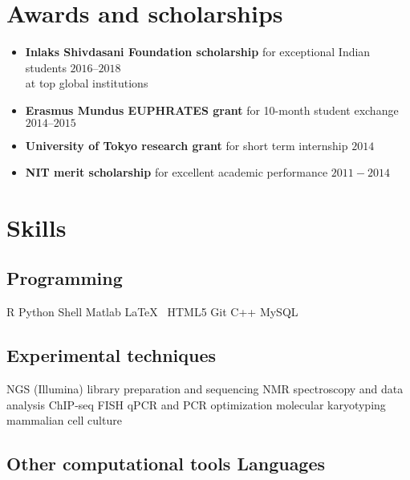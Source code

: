 \documentclass[]{TT-resume}
\begin{document}
\begin{flushleft}
\section{Awards and scholarships}
\sectionsep
\begin{itemize}
\item \textbf{Inlaks Shivdasani Foundation scholarship} for exceptional Indian students \hfill \hfill $2016 – 2018$ \\ at top global institutions

\item \textbf{Erasmus Mundus EUPHRATES grant} for 10-month student exchange \hfill \hfill $2014 – 2015$

\item \textbf{University of Tokyo research grant} for short term internship \hfill \hfill $2014$
\item \textbf{NIT merit scholarship} for excellent academic performance \hfill \hfill $2011-2014$

\end{itemize}
\sectionsep


\noindent\makebox[\linewidth]{\color{primary}\rule{\paperwidth}{0.4pt}} 

\sectionsep
\section{Skills}
\sectionsep
\subsection{Programming}
\vspace{2pt}
R \textbullet{} Python \textbullet{} Shell \hfill Matlab \textbullet{} \LaTeX\ \textbullet{} HTML5 \textbullet{} Git \hfill C++ \textbullet{}  MySQL

\sectionsep

\subsection{Experimental techniques}
\vspace{2pt}
NGS (Illumina) library preparation and sequencing \textbullet{} NMR spectroscopy and data analysis \textbullet{} ChIP-seq \textbullet{} FISH \textbullet{} qPCR and PCR optimization \textbullet{} molecular karyotyping \textbullet{} mammalian cell culture
\sectionsep
\subsection{Other computational tools \hfill \hfill Languages }


\end{flushleft}
\end{document}
